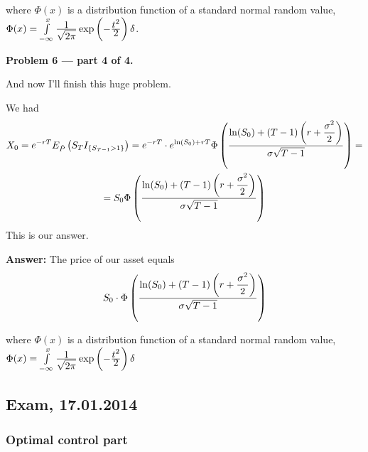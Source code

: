 \documentclass[pdftex,12pt,a4paper]{article}
\begin{document}
where $\Phi(x)$ is a distribution function of  a standard normal random value, $\Phi(x) = \int\limits_{-\infty}^{x}\frac{\displaystyle 1}{\displaystyle \sqrt{2\pi}}\exp\left(-\frac{\displaystyle t^{2}}{\displaystyle 2}\right)\delta$.


\textbf{Problem 6 --- part 4 of 4.}\par
And now I'll finish this huge problem.\par
We had
\begin{multline}
X_{0} = e^{-rT}E_{\tilde{P}}\left(S_{T}I_{\{S_{T-1}> 1\}}\right) = e^{-rT}\cdot e^{\ln(S_{0}) + rT}\Phi\left(\frac{\displaystyle \ln(S_{0}) + (T-1)\left(r + \frac{\displaystyle \sigma^{2}}{\displaystyle 2}\right)}{\displaystyle \sigma\sqrt{T-1}}\right) = \\
=
S_{0}\Phi\left(\frac{\displaystyle \ln(S_{0}) + (T-1)\left(r + \frac{\displaystyle \sigma^{2}}{\displaystyle 2}\right)}{\displaystyle \sigma\sqrt{T-1}}\right)
\end{multline}
This is our answer.

\textbf{Answer:} The price of our asset equals
$$
S_{0}\cdot\Phi\left(\frac{\displaystyle \ln(S_{0}) + (T-1)\left(r + \frac{\displaystyle \sigma^{2}}{\displaystyle 2}\right)}{\displaystyle \sigma\sqrt{T-1}}\right)
$$\par
where $\Phi(x)$ is a distribution function of  a standard normal random value, $\Phi(x) = \int\limits_{-\infty}^{x}\frac{\displaystyle 1}{\displaystyle \sqrt{2\pi}}\exp\left(-\frac{\displaystyle t^{2}}{\displaystyle 2}\right)\delta$


\subsection{Exam, 17.01.2014}

\subsubsection*{Optimal control part}
\end{document}
